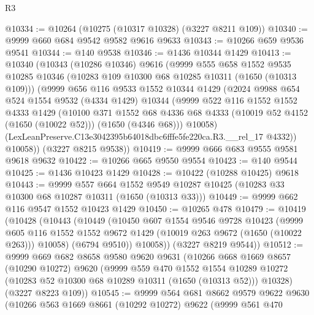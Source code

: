 \begin{lexlean}{R3}
\begin{coremodule}
@10334 := @10264 (@10275 (@10317 @10328) (@3227 @8211 @109))
@10340 := @9999 @660 @684 @9542 @9582 @9616 @9633
@10343 := @10266 @659 @9536 @9541
@10344 := @140 @9538
@10346 := @1436 @10344 @1429
@10413 := @10340
    (@10343
      (@10286 @10346)
      @9616
      (@9999
        @555
        @658
        @1552
        @9535
        @10285
        @10346
        (@10283 @109 @10300 @68 @10285 @10311 (@1650 (@10313 @109)))
        (@9999
          @656
          @116
          @9533
          @1552
          @10344
          @1429
          (@2024
            @9988
            @654
            @524
            @1554
            @9532
            (@4334 @1429)
            @10344
            (@9999
              @522
              @116
              @1552
              @1552
              @4333
              @1429
              (@10100
                @371
                @1552
                @68
                @4336
                @68
                @4333
                (@10019 @52 @4152 (@1650 (@10022 @52)))
                (@1650 (@4346 @68)))
              @10058)
            (LexLeanPreserve.C13e3042395b64018dbc6fffe5fe220ca.R3.__rel_17 @4332))
          @10058))
      (@3227 @8215 @9538))
@10419 := @9999 @666 @683 @9555 @9581 @9618 @9632
@10422 := @10266 @665 @9550 @9554
@10423 := @140 @9544
@10425 := @1436 @10423 @1429
@10428 := @10422 (@10288 @10425) @9618
@10443 := @9999
    @557
    @664
    @1552
    @9549
    @10287
    @10425
    (@10283 @33 @10300 @68 @10287 @10311 (@1650 (@10313 @33)))
@10449 := @9999 @662 @116 @9547 @1552 @10423 @1429
@10450 := @10265 @478
@10479 := @10419
    (@10428
      (@10443
        (@10449
          (@10450
            @607
            @1554
            @9546
            @9728
            @10423
            (@9999
              @605
              @116
              @1552
              @1552
              @9672
              @1429
              (@10019 @263 @9672 (@1650 (@10022 @263)))
              @10058)
            (@6794 @9510))
          @10058))
      (@3227 @8219 @9544))
@10512 := @9999
    @669
    @682
    @8658
    @9580
    @9620
    @9631
    (@10266
      @668
      @1669
      @8657
      (@10290 @10272)
      @9620
      (@9999
        @559
        @470
        @1552
        @1554
        @10289
        @10272
        (@10283 @52 @10300 @68 @10289 @10311 (@1650 (@10313 @52)))
        @10328)
      (@3227 @8223 @109))
@10545 := @9999
    @564
    @681
    @8662
    @9579
    @9622
    @9630
    (@10266
      @563
      @1669
      @8661
      (@10292 @10272)
      @9622
      (@9999
        @561
        @470

\end{coremodule}
\end{lexlean}
